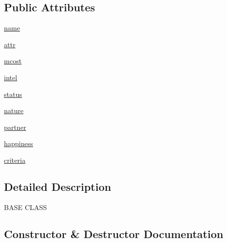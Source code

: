 \subsection*{Public Attributes}
\begin{DoxyCompactItemize}
\item 
\hyperlink{classgirls_1_1girl_1_1_girl_a9240f842435b25ad794b419ff9d32ef4}{name}
\item 
\hyperlink{classgirls_1_1girl_1_1_girl_a5ce2777085f6b756ed283669645109d2}{attr}
\item 
\hyperlink{classgirls_1_1girl_1_1_girl_a95193cb59f14d7ff3c149a9c92bd9a24}{mcost}
\item 
\hyperlink{classgirls_1_1girl_1_1_girl_a11bb864cf299a2406c3ae21e9d3fbcf5}{intel}
\item 
\hyperlink{classgirls_1_1girl_1_1_girl_a13abe6f47843d4dbb5b440a8d0a3962c}{status}
\item 
\hyperlink{classgirls_1_1girl_1_1_girl_a4cb999073362cd0620d14b749121d270}{nature}
\item 
\hyperlink{classgirls_1_1girl_1_1_girl_a151b6dfbeb54bbd8ff97b85b018c759f}{partner}
\item 
\hyperlink{classgirls_1_1girl_1_1_girl_a6c2033c4512e53bf950f6bc27244c321}{happiness}
\item 
\hyperlink{classgirls_1_1girl_1_1_girl_a6321f0bee18e529333abe592a4e99a8b}{criteria}
\end{DoxyCompactItemize}


\subsection{Detailed Description}
\begin{DoxyVerb}BASE CLASS\end{DoxyVerb}
 

\subsection{Constructor \& Destructor Documentation}
